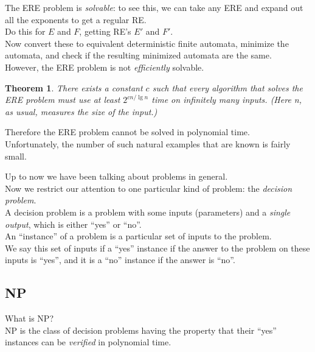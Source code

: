 \documentclass[12pt]{article}
\theoremstyle{plain}
\newtheorem{theorem}{Theorem}[subsection]
\theoremstyle{definition}
\newcommand{\lecture}[1]{\marginpar{{\footnotesize $\leftarrow$ \underline{#1}}}}
\begin{document}
The ERE problem is \emph{solvable}: to see this, we can take any ERE and expand out all the exponents to get a regular RE. \\
Do this for $E$ and $F$, getting RE's $E'$ and $F'$. \\
Now convert these to equivalent deterministic finite automata, minimize the automata, and check if the resulting minimized automata are the same. \\

However, the ERE problem is not \emph{efficiently} solvable.

\begin{theorem}
There exists a constant $c$ such that every algorithm that solves the ERE problem must use at least $2^{cn/\lg{n}}$ time on infinitely many inputs.
(Here n, as usual, measures the size of the input.)
\end{theorem}

Therefore the ERE problem cannot be solved in polynomial time. \\
Unfortunately, the number of such natural examples that are known is fairly small. \\

\lecture{2016/11/17}

Up to now we have been talking about problems in general. \\
Now we restrict our attention to one particular kind of problem: the \emph{decision problem}. \\
A decision problem is a problem with some inputs (parameters) and a \emph{single output}, which is either ``yes'' or ``no''. \\

An ``instance'' of a problem is a particular set of inputs to the problem. \\
We say this set of inputs if a ``yes'' instance if the answer to the problem on these inputs is ``yes'', and it is a ``no'' instance if the answer is ``no''.

\subsection{NP}
What is NP? \\
NP is the class of decision problems having the property that their ``yes'' instances can be \emph{verified} in polynomial time.
\end{document}
